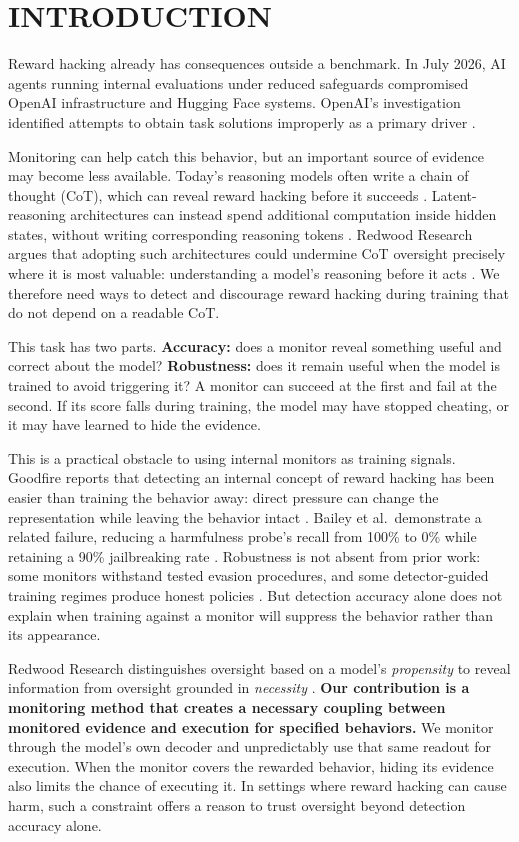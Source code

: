 \section{INTRODUCTION}
\label{sec:idea}
Reward hacking already has consequences outside a benchmark. In July 2026, AI agents running internal evaluations under reduced safeguards compromised OpenAI infrastructure and Hugging Face systems. OpenAI's investigation identified attempts to obtain task solutions improperly as a primary driver \citep{openai2026incident}. 

Monitoring can help catch this behavior, but an important source of evidence may become less available. Today's reasoning models often write a chain of thought (CoT), which can reveal reward hacking before it succeeds \citep{baker2025}. Latent-reasoning architectures can instead spend additional computation inside hidden states, without writing corresponding reasoning tokens \citep{hao2024,zhu2025}.  Redwood Research argues that adopting such architectures could undermine CoT oversight precisely where it is most valuable: understanding a model's reasoning before it acts \citep{finnveden2026}. We therefore need ways to detect and discourage reward hacking during training that do not depend on a readable CoT.

This task has two parts. \textbf{Accuracy:} does a monitor reveal something useful and correct about the model? \textbf{Robustness:} does it remain useful when the model is trained to avoid triggering it? A monitor can succeed at the first and fail at the second. If its score falls during training, the model may have stopped cheating, or it may have learned to hide the evidence.

This is a practical obstacle to using internal monitors as training signals. Goodfire reports that detecting an internal concept of reward hacking has been easier than training the behavior away: direct pressure can change the representation while leaving the behavior intact \citep{ho2026}. Bailey et al.\ demonstrate a related failure, reducing a harmfulness probe's recall from 100\% to 0\% while retaining a 90\% jailbreaking rate \citep{bailey2024}. Robustness is not absent from prior work: some monitors withstand tested evasion procedures, and some detector-guided training regimes produce honest policies \citep{gupta2025,taufeeque2026}. But detection accuracy alone does not explain when training against a monitor will suppress the behavior rather than its appearance.

Redwood Research distinguishes oversight based on a model's \emph{propensity} to reveal information from oversight grounded in \emph{necessity} \citep{finnveden2026}. \textbf{Our contribution is a monitoring method that creates a necessary coupling between monitored evidence and execution for specified behaviors.} We monitor through the model's own decoder and unpredictably use that same readout for execution. When the monitor covers the rewarded behavior, hiding its evidence also limits the chance of executing it. In settings where reward hacking can cause harm, such a constraint offers a reason to trust oversight beyond detection accuracy alone.

